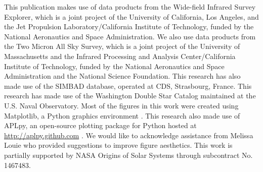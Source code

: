     
This publication makes use of data products from the Wide-field Infrared Survey Explorer, which is a joint project of the University of California, Los Angeles, and the Jet Propulsion Laboratory/California Institute of Technology, funded by the National Aeronautics and Space Administration. We also use data products from the Two Micron All Sky Survey, which is a joint project of the University of Massachusetts and the Infrared Processing and Analysis Center/California Institute of Technology, funded by the National Aeronautics and Space Administration and the National Science Foundation. This research has also made use of the SIMBAD database, operated at CDS, Strasbourg, France. This research has made use of the Washington Double Star Catalog maintained at the U.S. Naval Observatory. Most of the figures in this work were created using Matplotlib, a Python graphics environment \citep{Hunter2007}. This research also made use of APLpy, an open-source plotting package for Python hosted at \url{http://aplpy.github.com} \citep{Robitaille2012}. We would like to acknowledge assistance from Melissa Louie who provided suggestions to improve figure aesthetics. This work is partially supported by NASA Origins of Solar Systems through subcontract No. 1467483. 



